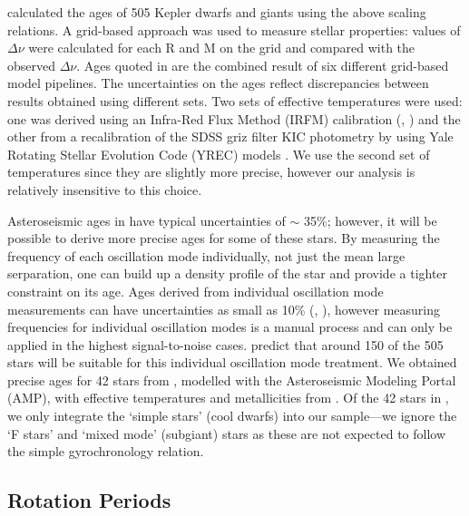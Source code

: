 \documentclass[12pt,preprint]{aastex}
\begin{document}
\citet{Chaplin2013} calculated the ages of 505 Kepler dwarfs and giants using the above scaling relations.
A grid-based approach was used to measure stellar properties: values of $\Delta\nu$ were calculated for each R and M on the grid and compared with the observed $\Delta\nu$.
Ages quoted in \citet{Chaplin2013} are the combined result of six different grid-based model pipelines.
The uncertainties on the ages reflect discrepancies between results obtained using different sets.
Two sets of effective temperatures were used: one was derived using an Infra-Red Flux Method (IRFM) calibration (\citealt{Casagrande2010}, \citealt{SilvaAguirre2012}) and the other from a recalibration of the SDSS griz filter KIC photometry by \citet{Pinsonneault2012} using Yale Rotating Stellar Evolution Code (YREC) models \citep{Demarque2004}.
We use the second set of temperatures since they are slightly more precise, however our analysis is relatively insensitive to this choice.

Asteroseismic ages in \citet{Chaplin2013} have typical uncertainties of $\sim$ 35\%; however, it will be possible to derive more precise ages for some of these stars.
By measuring the frequency of each oscillation mode individually, not just the mean large serparation, one can build up a density profile of the star and provide a tighter constraint on its age.
Ages derived from individual oscillation mode measurements can have uncertainties as small as 10\% (\citet{Brown1994}, \citet{SilvaAguirre2013}), however measuring frequencies for individual oscillation modes is a manual process and can only be applied in the highest signal-to-noise cases.
\citet{Chaplin2013} predict that around 150 of the 505 stars will be suitable for this individual oscillation mode treatment.
We obtained precise ages for 42 stars from \citet{Metcalfe2014}, modelled with the Asteroseismic Modeling Portal (AMP), with effective temperatures and metallicities from \citet{Bruntt2012}.
Of the 42 stars in \citet{Metcalfe2014}, we only integrate the `simple stars' (cool dwarfs) into our sample---we ignore the `F stars' and `mixed mode' (subgiant) stars as these are not expected to follow the simple gyrochronology relation.

\subsection{Rotation Periods}
\label{sec:rotation_periods}
\end{document}
